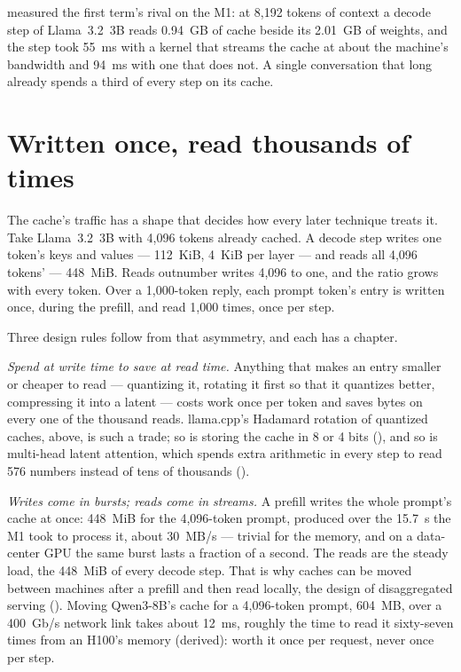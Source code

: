  measured the first term's rival on the M1: at 8,192 tokens
of context a decode step of Llama~3.2~3B reads 0.94~GB of cache beside its
2.01~GB of weights, and the step took 55~ms with a kernel that streams the cache
at about the machine's bandwidth and 94~ms with one that does not. A single
conversation that long already spends a third of every step on its cache.

\section{Written once, read thousands of times}

The cache's traffic has a shape that decides how every later technique treats
it. Take Llama~3.2~3B with 4,096 tokens already cached. A decode step writes one
token's keys and values --- 112~KiB, 4~KiB per layer --- and reads all 4,096
tokens' --- 448~MiB. Reads outnumber writes 4,096 to one, and the ratio grows
with every token. Over a 1,000-token reply, each prompt token's entry is
written once, during the prefill, and read 1,000 times, once per step.

Three design rules follow from that asymmetry, and each has a chapter.

\emph{Spend at write time to save at read time.} Anything that makes an entry
smaller or cheaper to read --- quantizing it, rotating it first so that it
quantizes better, compressing it into a latent --- costs work once per token and
saves bytes on every one of the thousand reads. llama.cpp's Hadamard rotation of
quantized caches, above, is such a trade; so is storing the cache in 8 or 4
bits (), and so is multi-head latent attention, which
spends extra arithmetic in every step to read 576 numbers instead of tens of
thousands ().

\emph{Writes come in bursts; reads come in streams.} A prefill writes the whole
prompt's cache at once: 448~MiB for the 4,096-token prompt, produced over the
15.7~s the M1 took to process it, about 30~MB/s --- trivial for the memory, and
on a data-center GPU the same burst lasts a fraction of a second. The reads are
the steady load, the 448~MiB of every decode step. That is why caches can be
moved between machines after a prefill and then read locally, the design of
disaggregated serving (). Moving Qwen3-8B's cache
for a 4,096-token prompt, 604~MB, over a 400~Gb/s network link takes about 12~ms,
roughly the time to read it sixty-seven times from an H100's memory (derived):
worth it once per request, never once per step.

